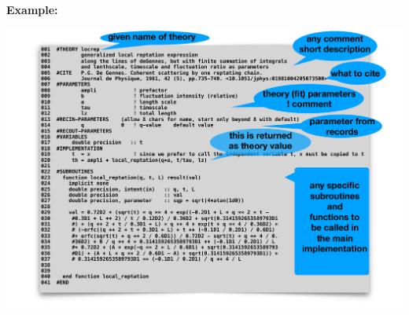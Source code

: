 \documentclass[11pt,fleqn]{book} %
\newcommand{\linespace}{\vspace{4ex}}
\begin{document}
% 
\linespace
{\bf Example:}
\linespace

\includegraphics[width=\textwidth]{thtemplateexample.pdf}
\end{document}
